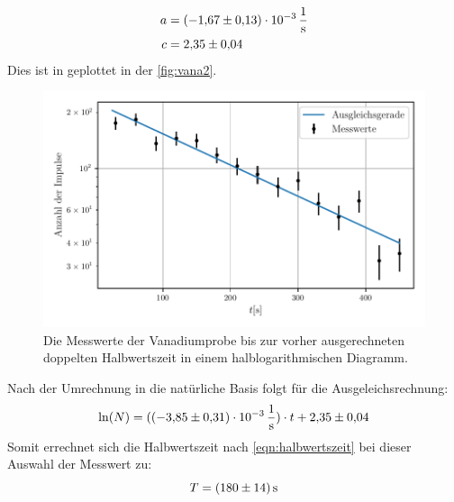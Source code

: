 \begin{align*}
  a &= \SI{-1.67(13)e-3}{\per\second}\\
  c &= \num{2.35 \pm 0.04}
\end{align*}
Dies ist in geplottet in der \autoref{fig:vana2}.
\begin{figure}
  \centering
  \includegraphics{build/vana2.pdf}
  \caption{Die Messwerte der Vanadiumprobe bis zur vorher ausgerechneten doppelten Halbwertszeit in einem halblogarithmischen Diagramm.}
  \label{fig:vana2}
\end{figure}
Nach der Umrechnung in die natürliche Basis folgt für die Ausgeleichsrechnung:
\begin{equation*}
  \ln(N) = (\SI{-3.85(31)e-3}{\per\second}) \cdot t +\num{2.35 \pm 0.04}
\end{equation*}
Somit errechnet sich die Halbwertszeit nach \eqref{eqn:halbwertszeit} bei dieser Auswahl der Messwert zu:
\begin{equation*}
  T = \SI{180 \pm 14}{\second}
\end{equation*}


